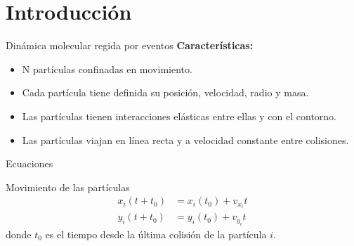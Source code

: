 \section{Introducción}\label{sec:introduccion}

\begin{frame}{Dinámica molecular regida por eventos}
    \textbf{Características:}
    \begin{itemize}
        \item N partículas confinadas en movimiento.
        \item Cada partícula tiene definida su posición, velocidad, radio y masa.
        \item Las partículas tienen interacciones elásticas entre ellas y con el contorno.
        \item Las partículas viajan en línea recta y a velocidad constante entre colisiones.
    \end{itemize}
\end{frame}

\begin{frame}{Ecuaciones}

    \begin{block}{Movimiento de las partículas}
        \begin{equation*}
            \begin{aligned}
                x_i(t+t_0) &= x_i(t_0) + v_{x_i}t \\
                y_i(t+t_0) &= y_i(t_0) + v_{y_i}t
            \end{aligned}\label{eq:equation-particles-movement}
        \end{equation*}
        donde \(t_0\) es el tiempo desde la última colisión de la partícula \(i\).
    \end{block}
\end{frame}

